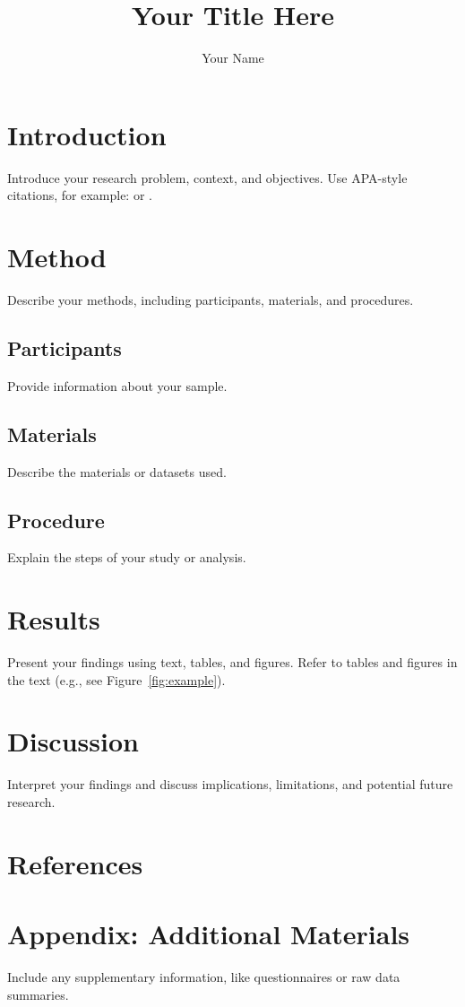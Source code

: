 \documentclass[man,12pt]{apa6} %
\title{Your Title Here}
\author{Your Name}
\affiliation{Your Institution}
\begin{document}
\maketitle

\section{Introduction}
Introduce your research problem, context, and objectives. Use APA-style citations, for example:  or \cite{johnson2019}.

\section{Method}
Describe your methods, including participants, materials, and procedures.

\subsection{Participants}
Provide information about your sample.

\subsection{Materials}
Describe the materials or datasets used.

\subsection{Procedure}
Explain the steps of your study or analysis.

\section{Results}
Present your findings using text, tables, and figures. Refer to tables and figures in the text (e.g., see Figure~\ref{fig:example}).

\section{Discussion}
Interpret your findings and discuss implications, limitations, and potential future research.

\section{References}

\appendix
\section{Appendix: Additional Materials}
Include any supplementary information, like questionnaires or raw data summaries.
\end{document}
